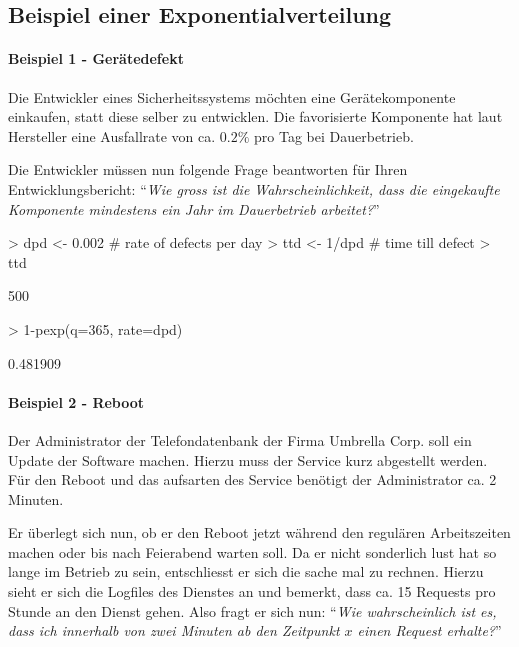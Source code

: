 \clearpage

\subsection{Beispiel einer Exponentialverteilung}
\paragraph{Beispiel 1 - Gerätedefekt}
Die Entwickler eines Sicherheitssystems möchten eine Gerätekomponente
einkaufen, statt diese selber zu entwicklen. Die favorisierte Komponente
hat laut Hersteller eine Ausfallrate von ca. $0.2\%$ pro Tag bei 
Dauerbetrieb.

Die Entwickler müssen nun folgende Frage beantworten für Ihren 
Entwicklungsbericht: "`\emph{Wie gross ist die Wahrscheinlichkeit, dass
die eingekaufte Komponente mindestens ein Jahr im Dauerbetrieb arbeitet?}"'

\begin{Schunk}
\begin{Sinput}
> dpd <- 0.002 # rate of defects per day
> ttd <- 1/dpd # time till defect
> ttd
\end{Sinput}
\begin{Soutput}
[1] 500
\end{Soutput}
\begin{Sinput}
> 1-pexp(q=365, rate=dpd)
\end{Sinput}
\begin{Soutput}
[1] 0.481909
\end{Soutput}
\end{Schunk}

\paragraph{Beispiel 2 - Reboot}
Der Administrator der Telefondatenbank der Firma Umbrella Corp. soll ein 
Update der Software machen. Hierzu muss der Service kurz abgestellt werden. 
Für den Reboot und das aufsarten des Service benötigt der Administrator ca. 
2 Minuten. 

Er überlegt sich nun, ob er den Reboot jetzt während den regulären 
Arbeitszeiten machen oder bis nach Feierabend warten soll. Da er nicht
sonderlich lust hat so lange im Betrieb zu sein, entschliesst er sich die
sache mal zu rechnen. Hierzu sieht er sich die Logfiles des Dienstes an und
bemerkt, dass ca. 15 Requests pro Stunde an den Dienst gehen. Also fragt er
sich nun: "`\emph{Wie wahrscheinlich ist es, dass ich innerhalb von zwei 
Minuten ab den Zeitpunkt $x$ einen Request erhalte?}"'

